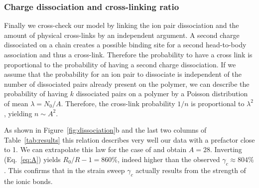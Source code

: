 \documentclass[journal=jacsat,manuscript=article]{achemso}
\begin{document}
\subsubsection{Charge dissociation and cross-linking ratio}

Finally we cross-check our model by linking the ion pair dissociation and the amount of physical cross-links by an independent argument. A second charge dissociated on a chain creates a possible binding site for a second head-to-body association and thus a cross-link. Therefore the probability to have a cross link is proportional to the probability of having a second charge dissociation. If we assume that the probability for an ion pair to dissociate is independent of the number of dissociated pairs already present on the polymer, we can describe the probability of having $k$ dissociated pairs on a polymer by a Poisson distribution of mean $\lambda = N_0/A$. Therefore, the cross-link probability $1/n$ is proportional to $\lambda^2$, yielding $n \sim A^2$.

As shown in Figure~\ref{fig:dissociation}b and the last two columns of Table~\ref{tab:results} this relation describes very well our data with a prefactor close to 1. We can extrapolate this law for the case of  and obtain $A = 28$. Inverting (Eq.~\ref{eq:A}) yields $R_0/R - 1 = 860\%$, indeed higher than the observed $\gamma_c\approx 804\%$. This confirms that in the  strain sweep $\gamma_c$ actually results from the strength of the ionic bonds.

\end{document}
